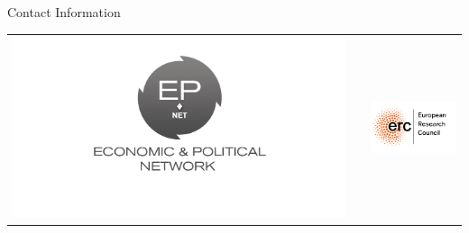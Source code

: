 \documentclass[final]{beamer}
\newlength{\onecolwid}
\begin{document}
\begin{frame}[t]
\begin{columns}[t]
\begin{column}{\onecolwid}
\begin{block}{Contact Information}
\end{block}

\begin{center}
\begin{tabular}{ccc}
\includegraphics[width=0.4\linewidth]{images/epnet.png} & \hfill & \includegraphics[width=0.4\linewidth]{images/erc.png}
\end{tabular}
\end{center}


\end{column} %

\end{columns} %

\end{frame} %
\end{document}
